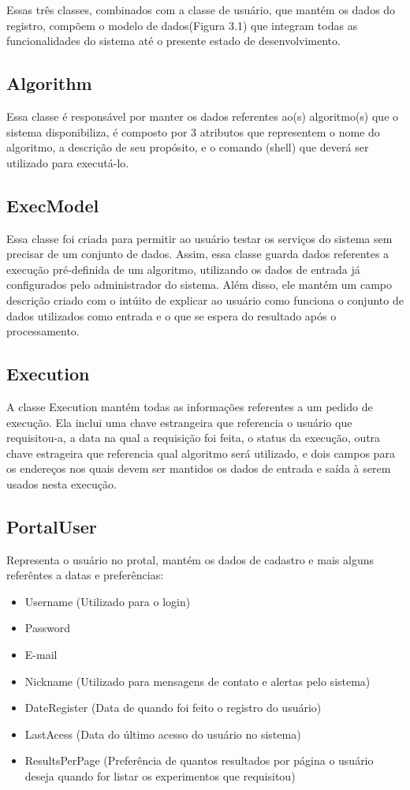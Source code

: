 \documentclass[tg]{mdtufsm}
\begin{document}
Essas três classes, combinados com a classe de usuário, que mantém os dados do registro, compõem o modelo de dados(Figura 3.1) que integram todas as funcionalidades do sistema até o presente estado de desenvolvimento.

\subsection{Algorithm}
Essa classe é responsável por manter os dados referentes ao(s) algoritmo(s) que o sistema disponibiliza, é composto por 3 atributos que representem o nome do algoritmo, a descrição de seu propósito, e o comando (shell) que deverá ser utilizado para executá-lo.

\subsection{ExecModel}
Essa classe foi criada para permitir ao usuário testar os serviços do sistema sem precisar de um conjunto de dados. Assim, essa classe guarda dados referentes a execução pré-definida de um algoritmo, utilizando os dados de entrada já configurados pelo administrador do sistema. Além disso, ele mantém um campo descrição criado com o intúito de explicar ao usuário como funciona o conjunto de dados utilizados como entrada e o que se espera do resultado após o processamento.

\subsection{Execution}
A classe Execution mantém todas as informações referentes a um pedido de execução. Ela inclui uma chave estrangeira que referencia o usuário que requisitou-a, a data na qual a requisição foi feita, o status da execução, outra chave estrageira que referencia qual algoritmo será utilizado, e dois campos para os endereços nos quais devem ser mantidos os dados de entrada e saída à serem usados nesta execução.

\subsection{PortalUser}
Representa o usuário no protal, mantém os dados de cadastro e mais alguns referêntes a datas e preferências:

\begin{itemize}
	\item Username (Utilizado para o login)
	\item Password 
	\item E-mail
	\item Nickname (Utilizado para mensagens de contato e alertas pelo sistema)
	\item DateRegister (Data de quando foi feito o registro do usuário)
	\item LastAcess (Data do último acesso do usuário no sistema)
	\item ResultsPerPage (Preferência de quantos resultados por página o usuário deseja quando for listar os experimentos que requisitou)
\end{itemize}
\end{document}
